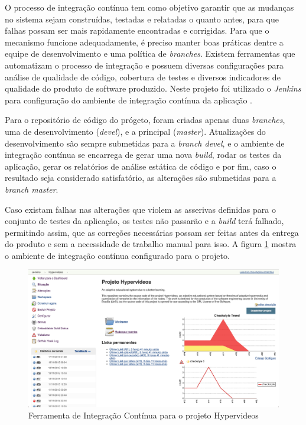O processo de integração contínua tem como objetivo garantir que as mudanças no sistema sejam construídas, testadas e relatadas o quanto antes, para que falhas possam ser mais rapidamente encontradas e corrigidas. Para que o mecanismo funcione adequadamente, é preciso manter boas práticas dentre a equipe de desenvolvimento e uma política de \textit{branches}. Existem ferramentas que automatizam o processo de integração e possuem diversas configurações para análise de qualidade de código, cobertura de testes e diversos indicadores de qualidade do produto de software produzido. Neste projeto foi utilizado o \textit{Jenkins} para configuração do ambiente de integração contínua da aplicação \cite{jenkins2015}.

Para o repositório de código do prógeto, foram criadas apenas duas \textit{branches}, uma de desenvolvimento (\textit{devel}), e a principal (\textit{master}). Atualizações do desenvolvimento são sempre submetidas para a \textit{branch devel}, e o ambiente de integração contínua se encarrega de gerar uma nova \textit{build}, rodar os testes da aplicação, gerar os relatórios de análise estática de código e por fim, caso o resultado seja considerado satisfatório, as alterações são submetidas para a \textit{branch master}. 

Caso existam falhas nas alterações que violem as asserivas definidas para o conjunto de testes da aplicação, os testes não passarão e a \textit{build} terá falhado, permitindo assim, que as correções necessárias possam ser feitas antes da entrega do produto e sem a necessidade de trabalho manual para isso. A figura \ref{fig:jenkins} mostra o ambiente de integração contínua configurado para o projeto. 

\begin{figure}[h!]
  	\centering
  	\includegraphics[width=1\linewidth]{figuras/jenkins.eps}
  	\caption{Ferramenta de Integração Contínua para o projeto Hypervideos}
  	\label{fig:jenkins}
\end{figure}

